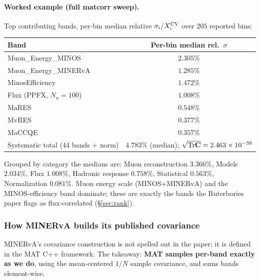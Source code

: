 \paragraph{Worked example (full matcorr sweep).}
Top contributing bands, per-bin median relative
$\sigma_{i}/X^{\text{CV}}_{i}$ over $205$ reported bins:
\begin{center}
\begin{tabular}{@{}lc@{}}
\toprule
Band & Per-bin median rel.\ $\sigma$ \\
\midrule
Muon\_Energy\_MINOS & $2.305\%$ \\
Muon\_Energy\_MINERvA & $1.285\%$ \\
MinosEfficiency & $1.472\%$ \\
Flux (PPFX, $N_{u}=100$) & $1.008\%$ \\
MaRES & $0.548\%$ \\
MvRES & $0.377\%$ \\
MaCCQE & $0.357\%$ \\
\midrule
Systematic total (44 bands $+$ norm) & $\boxed{4.783\%}$ (median); $\sqrt{\mathrm{Tr}\mathbf{C}}=2.463\times10^{-39}$ \\
\bottomrule
\end{tabular}
\end{center}
Grouped by category the medians are: Muon reconstruction $3.366\%$,
Models $2.034\%$, Flux $1.008\%$, Hadronic response $0.758\%$,
Statistical $0.563\%$, Normalization $0.081\%$. Muon energy scale
(MINOS$+$MINERvA) and the MINOS-efficiency band dominate; these are
exactly the bands the Ruterbories paper flags as flux-correlated
(\S\ref{sec:rank}).

\subsubsection{How MINERvA builds its published covariance}
\label{sec:minerva}

MINERvA's covariance construction is not spelled out in the paper; it
is defined in the MAT C++
framework. The takeaway: \textbf{MAT samples per-band exactly as we do},
using the mean-centered $1/N$ sample covariance, and sums bands
element-wise.

